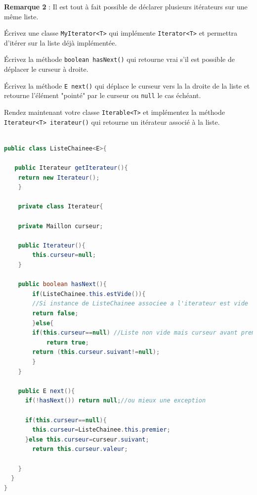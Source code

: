 \documentclass[iutinfo,a4paper,nocorrections,10pt]{ustl-tdtp}
\begin{document}
\textbf{Remarque 2} : Il est tout à fait possible de déclarer plusieurs itérateurs sur une même liste.\newline

\question Écrivez une classe \texttt{MyIterator<T>} qui implémente \texttt{Iterator<T>} et permettra d'itérer sur la liste déjà implémentée.

\question Écrivez la méthode \texttt{boolean hasNext()} qui retourne vrai s'il est possible de déplacer le curseur à droite.\newline

\question Écrivez la méthode \texttt{E next()} qui déplace le curseur vers la la droite de la liste et retourne l'élément "pointé" par le curseur ou \texttt{null} le cas échéant.\newline

\question Rendez maintenant votre classe \texttt{Iterable<T>} et implémentez la méthode \texttt{Iterateur<T> iterateur()} qui retourne un itérateur associé à la liste.\newline




\begin{correction}
{\color{red}
\begin{lstlisting}[language=Java]

public class ListeChainee<E>{

   public Iterateur getIterateur(){
	return new Iterateur();
    }

    private class Iterateur{
   	
   	private Maillon curseur;
   	
   	public Iterateur(){
	    this.curseur=null;
   	}
   	
   	public boolean hasNext(){
	    if(ListeChainee.this.estVide()){ 
		//Si instance de ListeChainee associee a l'iterateur est vide
		return false;	    	  
	    }else{
		if(this.curseur==null) //Liste non vide mais curseur avant premier maillon
		    return true; 	
		return (this.curseur.suivant!=null);
        }
    }   
	
    public E next(){
      if(!hasNext()) return null;//ou mieux une exception
      
      if(this.curseur==null){
        this.curseur=ListeChainee.this.premier;
      }else this.curseur=curseur.suivant;
        return this.curseur.valeur;
       
    }
  }
}


\end{lstlisting}
}

\end{correction}
\end{document}
